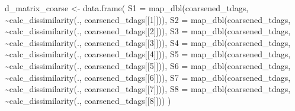 \documentclass[
  letterpaper,
  DIV=11,
  numbers=noendperiod]{scrartcl}
\newenvironment{Shaded}{\begin{snugshade}}{\end{snugshade}}
\newcommand{\AttributeTok}[1]{\textcolor[rgb]{0.40,0.45,0.13}{#1}}
\newcommand{\DecValTok}[1]{\textcolor[rgb]{0.68,0.00,0.00}{#1}}
\newcommand{\FunctionTok}[1]{\textcolor[rgb]{0.28,0.35,0.67}{#1}}
\newcommand{\NormalTok}[1]{\textcolor[rgb]{0.00,0.23,0.31}{#1}}
\newcommand{\OtherTok}[1]{\textcolor[rgb]{0.00,0.23,0.31}{#1}}
\newcommand{\SpecialCharTok}[1]{\textcolor[rgb]{0.37,0.37,0.37}{#1}}
\begin{document}
\begin{Shaded}
\begin{Highlighting}[]
\NormalTok{d\_matrix\_coarse }\OtherTok{\textless{}{-}}  
    \FunctionTok{data.frame}\NormalTok{(}
        \AttributeTok{S1 =} \FunctionTok{map\_dbl}\NormalTok{(coarsened\_tdags, }\SpecialCharTok{\textasciitilde{}}\FunctionTok{calc\_dissimilarity}\NormalTok{(., coarsened\_tdags[[}\DecValTok{1}\NormalTok{]])),}
        \AttributeTok{S2 =} \FunctionTok{map\_dbl}\NormalTok{(coarsened\_tdags, }\SpecialCharTok{\textasciitilde{}}\FunctionTok{calc\_dissimilarity}\NormalTok{(., coarsened\_tdags[[}\DecValTok{2}\NormalTok{]])),}
        \AttributeTok{S3 =} \FunctionTok{map\_dbl}\NormalTok{(coarsened\_tdags, }\SpecialCharTok{\textasciitilde{}}\FunctionTok{calc\_dissimilarity}\NormalTok{(., coarsened\_tdags[[}\DecValTok{3}\NormalTok{]])),}
        \AttributeTok{S4 =} \FunctionTok{map\_dbl}\NormalTok{(coarsened\_tdags, }\SpecialCharTok{\textasciitilde{}}\FunctionTok{calc\_dissimilarity}\NormalTok{(., coarsened\_tdags[[}\DecValTok{4}\NormalTok{]])),}
        \AttributeTok{S5 =} \FunctionTok{map\_dbl}\NormalTok{(coarsened\_tdags, }\SpecialCharTok{\textasciitilde{}}\FunctionTok{calc\_dissimilarity}\NormalTok{(., coarsened\_tdags[[}\DecValTok{5}\NormalTok{]])),}
        \AttributeTok{S6 =} \FunctionTok{map\_dbl}\NormalTok{(coarsened\_tdags, }\SpecialCharTok{\textasciitilde{}}\FunctionTok{calc\_dissimilarity}\NormalTok{(., coarsened\_tdags[[}\DecValTok{6}\NormalTok{]])),}
        \AttributeTok{S7 =} \FunctionTok{map\_dbl}\NormalTok{(coarsened\_tdags, }\SpecialCharTok{\textasciitilde{}}\FunctionTok{calc\_dissimilarity}\NormalTok{(., coarsened\_tdags[[}\DecValTok{7}\NormalTok{]])),}
        \AttributeTok{S8 =} \FunctionTok{map\_dbl}\NormalTok{(coarsened\_tdags, }\SpecialCharTok{\textasciitilde{}}\FunctionTok{calc\_dissimilarity}\NormalTok{(., coarsened\_tdags[[}\DecValTok{8}\NormalTok{]]))}
\NormalTok{        )}


\end{Highlighting}
\end{Shaded}
\end{document}
